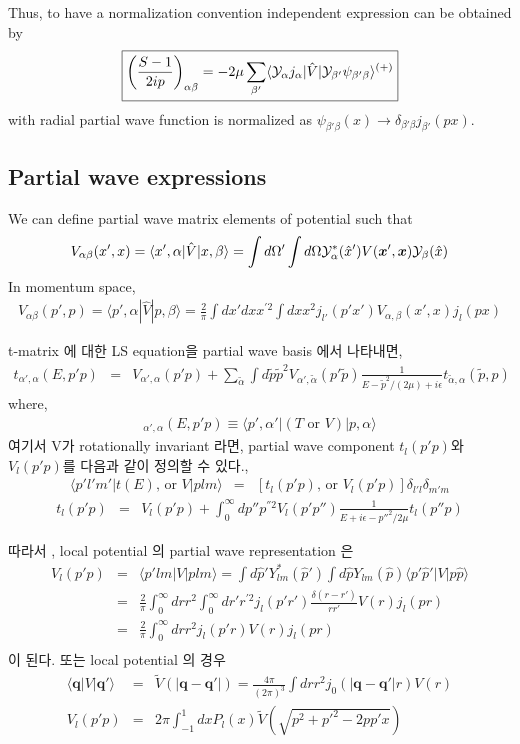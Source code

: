 \documentclass[10pt]{book}
\def\bm{\boldsymbol}
\newcommand{\bea}{\begin{eqnarray}}
\newcommand{\eea}{\end{eqnarray}}
\newcommand{\no}{\nonumber \\}
\def\vq{{\bm q}}
\def\vx{{\bm x}}
\def\la{\langle}
\def\ra{\rangle}
\begin{document}
\begin{itemize}
      Thus, to have a normalization convention independent expression can be obtained by 
      \bea 
      \boxed{ 
      \left(\frac{S-1}{2ip}\right)_{\alpha\beta}
      = -2\mu \sum_{\beta'}
       \la {\cal Y}_\alpha j_\alpha|\hat{V}|{\cal Y}_{\beta'} \psi_{\beta'\beta}\ra^{(+)}} 
      \eea 
      with radial partial wave function is normalized as
      $\psi_{\beta'\beta}(x)\to \delta_{\beta'\beta}j_{\beta'}(px)$.


\subsection{Partial wave expressions}
We can define partial wave matrix elements 
of potential such that
\bea 
V_{\alpha\beta}(x',x )
=\la x',\alpha|\hat{V}|x, \beta \ra
=\int d\Omega'\int d\Omega 
 {\cal Y}^*_{\alpha}(\hat{x}')V(\vx',\vx)
 {\cal Y}_{\beta}(\hat{x}) 
\eea 
In momentum space,
\bea 
V_{\alpha\beta}(p',p)
=\la p',\alpha|\hat{V}|p,\beta\ra 
=\frac{2}{\pi}\int d x' dx x^{'2} \int dx x^2
 j_{l'}(p' x') V_{\alpha,\beta }(x',x)
 j_{l}(px) 
\eea 

t-matrix 에 대한 LS equation을 partial wave basis 에서 나타내면, 
\bea
t_{\alpha ',\alpha}(E,p' p)
&=&V_{\alpha',\alpha}(p'p)
+\sum_{\tilde{\alpha}}\int d\tilde{p}\tilde{p}^2
 V_{\alpha',\tilde{\alpha}}(p'\tilde{p})
\frac{1}{E-\tilde{p}^2/(2\mu)+i\epsilon}
 t_{\tilde{\alpha},\alpha}(\tilde{p},p)
\eea
where,
\bea 
[t\mbox{ or } V]_{\alpha ',\alpha}(E,p' p)\equiv
\la p',\alpha'|(T\mbox{ or } V)|p,\alpha\ra
\eea
여기서 V가 rotationally invariant 라면, 
partial wave component $t_l(p'p)$와 $V_l(p'p)$를 다음과 같이 정의할 수 있다.,
\bea
\la p' l' m'|t(E)\mbox{, or }V |p l m\ra
&=&[t_l(p'p)\mbox{, or }V_l(p'p)]\delta_{l'l}\delta_{m'm}
\eea
\bea
t_l(p'p)&=&V_l(p'p)+\int_0^\infty dp'' p^{''2} V_l(p'p'')\frac{1}{E+i\epsilon-p''^2/2\mu}t_l(p''p)
\eea

따라서 , local potential 의 partial wave representation 은 
\bea
V_l(p'p)&=&\la p' lm|V|p lm\ra
         =\int d\hat{p}' Y^*_{lm}(\hat{p}')
          \int d\hat{p} Y_{lm}(\hat{p})
          \la p' \hat{p}'|V|p\hat{p}\ra\no
           &=&\frac{2}{\pi}
           \int_0^\infty dr r^2\int_0^\infty dr' r^{'2} j_l(p'r')\frac{\delta(r-r')}{rr'}V(r) j_l(pr)\no
           &=&\frac{2}{\pi}\int_0^\infty dr r^2 j_l(p'r)V(r) j_l(pr)
           \no
\eea
이 된다. 또는 local potential 의 경우
\bea
\la \vq|V|\vq'\ra&=&\tilde{V}(|\vq-\vq'|)
                 =\frac{4\pi}{(2\pi)^3}
                 \int dr r^2 j_0(|\vq-\vq'|r) V(r)
\no
V_{l}(p'p)&=&2\pi\int_{-1}^1 dx P_l(x)\tilde{V}(\sqrt{p^2+p'^2-2pp' x})
\eea


\end{itemize}
\end{document}
